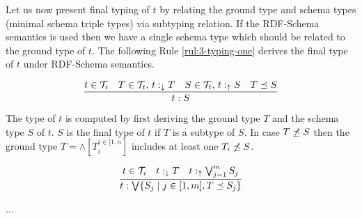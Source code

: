 \documentclass[runningheads]{llncs}
\newcommand{\s}{\scriptscriptstyle\ \,}
\newcommand{\darr}{\downarrow}
\newcommand{\uarr}{\uparrow}
\newcommand{\T}{{\cal T}}
\newcommand{\memo}[1]{}
\newcommand{\notes}[1]{\noindent\begin{small}-- \emph{#1}\hfill\break\end{small}}
\newcommand{\nnotes}[1]{\indent\begin{small}-- \emph{#1}\hfill\break\end{small}}
\begin{document}
Let us now present final typing of $t$ by relating the ground type and
schema types (minimal schema triple types) via subtyping relation. If
the RDF-Schema semantics is used then we have a single schema type
which should be related to the ground type of $t$. The following Rule
\ref{rul:3-typing-one} derives the final type of $t$ under RDF-Schema
semantics. 

\begin{equation}
\label{rul:3-typing-one}
\dfrac{t\in\T_i\quad T\in\T_t,\, t:_{\darr}T\quad S\in\T_t,\, t:_\uarr\/S\quad T\preceq\/S}
      {t:S}
\end{equation}

The type of $t$ is computed by first deriving the ground type $T$ and
the schema type $S$ of $t$. $S$ is the final type of $t$ if $T$ is a
subtype of $S$. In case $T\not\preceq\/S$ then the ground type
$T=\land[T_i^{i\in[1,n}]$ includes at least one $T_i\not\preceq\/S$.

\begin{equation}
\label{rul:3-typing-two}
\dfrac{t\in\T_i\quad t:_{\darr}T\quad\/t:_\uarr\bigvee_{j=1}^{m}\/S_j}
      {t:\bigvee\{S_j\mid\/j\in[1,m], T\preceq\/S_j\}}
\end{equation}



... \\




\memo{
\notes{Why using $\land$ and $\sqcap$ types for typing a triple $t$?}
\nnotes{We would like to check typing of a triple $t\in\T_i$.}
\nnotes{We compute first the ground type $T_g=\land[T_i^{\s\/i=1..n}]$ and a stored type $T$ of $t$.}
\nnotes{The ground type $T_g$ is computed from the ground types of $t$'s components.}
\nnotes{The subtype relation should hold $T_g\preceq\/T$.}

\notes{Two ways of defining semantics.}
\notes{1) enumeration style: stored types are enumerated as alternatives ($\lor$).}
\notes{2) packed together: alternative types are packed in one $\bigvee$ type.}
\notes{One advantage of (1) is that individual glb types can be processed further individually.}
\notes{Advantage of (2) is the higer-level semantics without going in implementation.}

\notes{Stored types have to be related to all join ground types to represent the correct type of a triple.}
\notes{It seems it would be easier to check the pairs one-by-one using (1) in algorithms.}
\notes{In case of using complete types in the phases, types would further have to be processed by $\land,\lor$ rules.}}
\end{document}
